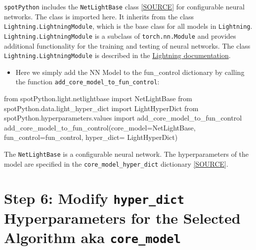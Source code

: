 \documentclass[
  letterpaper,
  DIV=11,
  numbers=noendperiod]{scrreprt}
\newenvironment{Shaded}{\begin{snugshade}}{\end{snugshade}}
\newcommand{\ImportTok}[1]{\textcolor[rgb]{0.00,0.46,0.62}{#1}}
\newcommand{\NormalTok}[1]{\textcolor[rgb]{0.00,0.23,0.31}{#1}}
\newcommand{\OperatorTok}[1]{\textcolor[rgb]{0.37,0.37,0.37}{#1}}
\providecommand{\tightlist}{%
  \setlength{\itemsep}{0pt}\setlength{\parskip}{0pt}}\usepackage{longtable,booktabs,array}
\begin{document}
\texttt{spotPython} includes the \texttt{NetLightBase} class
\href{https://github.com/sequential-parameter-optimization/spotPython/blob/main/src/spotPython/light/netlightbase.py}{{[}SOURCE{]}}
for configurable neural networks. The class is imported here. It
inherits from the class \texttt{Lightning.LightningModule}, which is the
base class for all models in \texttt{Lightning}.
\texttt{Lightning.LightningModule} is a subclass of
\texttt{torch.nn.Module} and provides additional functionality for the
training and testing of neural networks. The class
\texttt{Lightning.LightningModule} is described in the
\href{https://lightning.ai/docs/pytorch/stable/common/lightning_module.html}{Lightning
documentation}.

\begin{itemize}
\tightlist
\item
  Here we simply add the NN Model to the fun\_control dictionary by
  calling the function \texttt{add\_core\_model\_to\_fun\_control}:
\end{itemize}

\begin{Shaded}
\begin{Highlighting}[]
\ImportTok{from}\NormalTok{ spotPython.light.netlightbase }\ImportTok{import}\NormalTok{ NetLightBase }
\ImportTok{from}\NormalTok{ spotPython.data.light\_hyper\_dict }\ImportTok{import}\NormalTok{ LightHyperDict}
\ImportTok{from}\NormalTok{ spotPython.hyperparameters.values }\ImportTok{import}\NormalTok{ add\_core\_model\_to\_fun\_control}
\NormalTok{add\_core\_model\_to\_fun\_control(core\_model}\OperatorTok{=}\NormalTok{NetLightBase,}
\NormalTok{                              fun\_control}\OperatorTok{=}\NormalTok{fun\_control,}
\NormalTok{                              hyper\_dict}\OperatorTok{=}\NormalTok{ LightHyperDict)}
\end{Highlighting}
\end{Shaded}

The \texttt{NetLightBase} is a configurable neural network. The
hyperparameters of the model are specified in the
\texttt{core\_model\_hyper\_dict} dictionary
\href{https://github.com/sequential-parameter-optimization/spotPython/blob/main/src/spotPython/data/light_hyper_dict.json}{{[}SOURCE{]}}.

\hypertarget{sec-modification-of-hyperparameters-31}{%
\section{\texorpdfstring{Step 6: Modify \texttt{hyper\_dict}
Hyperparameters for the Selected Algorithm aka
\texttt{core\_model}}{Step 6: Modify hyper\_dict Hyperparameters for the Selected Algorithm aka core\_model}}\label{sec-modification-of-hyperparameters-31}}
\end{document}
